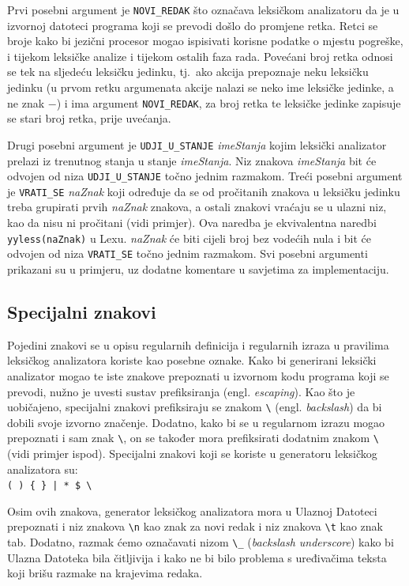 \documentclass[times, 12pt, utf8]{book}
\begin{document}
Prvi posebni argument je \verb|NOVI_REDAK| što označava leksičkom analizatoru da je u izvornoj datoteci programa koji se prevodi došlo do promjene retka.
Retci se broje kako bi jezični procesor mogao ispisivati korisne podatke o mjestu pogreške, i tijekom leksičke analize i tijekom ostalih faza rada.
Povećani broj retka odnosi se tek na sljedeću leksičku jedinku, tj.~ako akcija prepoznaje neku leksičku jedinku (u prvom retku argumenata akcije nalazi se neko ime leksičke jedinke, a ne znak \(-\)) i ima argument \verb|NOVI_REDAK|, za broj retka te leksičke jedinke zapisuje se stari broj retka, prije uvećanja.

Drugi posebni argument je \verb|UDJI_U_STANJE| \emph{imeStanja} kojim leksički analizator prelazi iz trenutnog stanja u stanje \emph{imeStanja}.
Niz znakova \emph{imeStanja} bit će odvojen od niza \verb|UDJI_U_STANJE| točno jednim razmakom.
Treći posebni argument je \verb|VRATI_SE| \emph{naZnak} koji određuje da se od pročitanih znakova u leksičku jedinku treba grupirati prvih \emph{naZnak} znakova, a ostali znakovi vraćaju se u ulazni niz, kao da nisu ni pročitani (vidi primjer).
Ova naredba je ekvivalentna naredbi \verb|yyless(naZnak)| u Lexu.
\emph{naZnak} će biti cijeli broj bez vodećih nula i bit će odvojen od niza \verb|VRATI_SE| točno jednim razmakom.
Svi posebni argumenti prikazani su u primjeru, uz dodatne komentare u savjetima za implementaciju.

\subsection{Specijalni znakovi}\label{sec:specijalni_znakovi}
Pojedini znakovi se u opisu regularnih definicija i regularnih izraza u pravilima leksičkog analizatora koriste kao posebne oznake.
Kako bi generirani leksički analizator mogao te iste znakove prepoznati u izvornom kodu programa koji se prevodi, nužno je uvesti sustav prefiksiranja (engl. \emph{escaping}).
Kao što je uobičajeno, specijalni znakovi prefiksiraju se znakom \verb|\| (engl. \emph{backslash}) da bi dobili svoje izvorno značenje.
Dodatno, kako bi se u regularnom izrazu mogao prepoznati i sam znak \verb|\|, on se također mora prefiksirati dodatnim znakom \verb|\| (vidi primjer ispod).
Specijalni znakovi koji se koriste u generatoru leksičkog analizatora su:\\
\verb=( ) { } | * $ \=

Osim ovih znakova, generator leksičkog analizatora mora u Ulaznoj Datoteci prepoznati i niz znakova \verb|\n| kao znak za novi redak i niz znakova \verb|\t| kao znak tab.
Dodatno, razmak ćemo označavati nizom \verb|\_| (\emph{backslash underscore}) kako bi Ulazna Datoteka bila čitljivija i kako ne bi bilo problema s uređivačima teksta koji brišu razmake na krajevima redaka.
\end{document}
